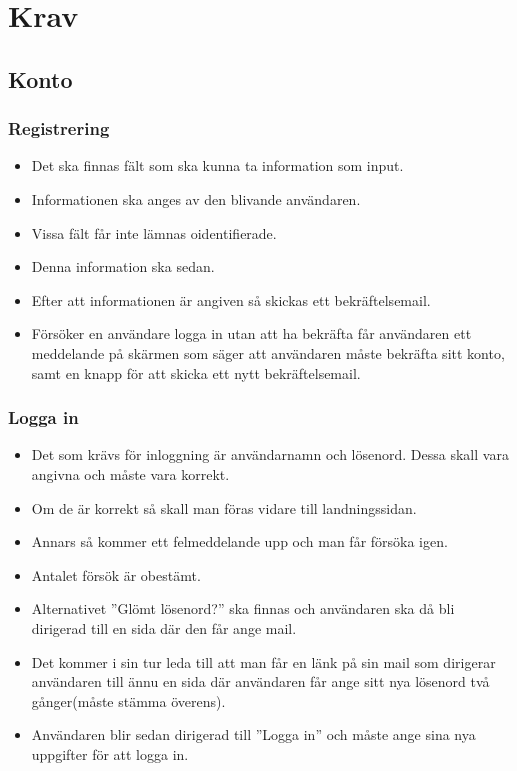 \documentclass[11pt, titlepage, oneside, a4paper]{article}	%
\begin{document}
\newpage

\section{Krav}
\subsection{Konto}
	\subsubsection*{Registrering}
	\begin{itemize}
		\item Det ska finnas fält som ska kunna ta information som input.
		\item Informationen ska anges av den blivande användaren.
		\item Vissa fält får inte lämnas oidentifierade.
		\item Denna information ska sedan.
		\item Efter att informationen är angiven så skickas ett bekräftelsemail.
		\item Försöker en användare logga in utan att ha bekräfta får användaren ett meddelande på skärmen som säger att användaren måste bekräfta sitt konto, samt en knapp för att skicka ett nytt 	bekräftelsemail.
	\end{itemize}
	\subsubsection*{Logga in}
	\begin{itemize}
		\item Det som krävs för inloggning är användarnamn och lösenord. Dessa skall vara angivna och måste vara korrekt. 
		\item Om de är korrekt så skall man föras vidare till landningssidan.
		\item Annars så kommer ett felmeddelande upp och man får försöka igen.
		\item Antalet försök är obestämt.
		\item Alternativet ”Glömt lösenord?” ska finnas och användaren ska då bli dirigerad till en sida där den får ange mail. 
		\item Det kommer i sin tur leda till att man får en länk på sin mail som dirigerar användaren till ännu en sida där användaren får ange sitt nya lösenord två gånger(måste stämma överens).
		\item Användaren blir sedan dirigerad till ”Logga in” och måste ange sina nya uppgifter för att logga in.
	\end{itemize} 
\end{document}
